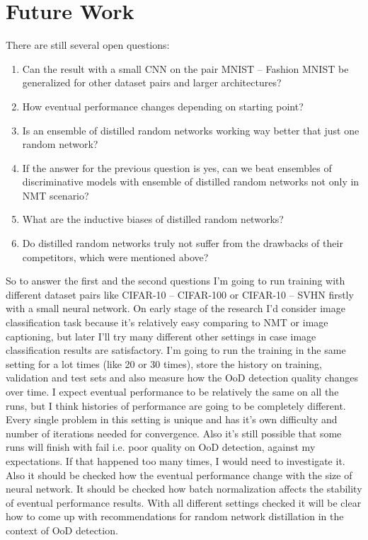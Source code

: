 \documentclass{article}
\begin{document}
\newpage
\section{Future Work}
    There are still several open questions:
    \begin{enumerate}
        \item Can the result with a small CNN on the pair MNIST -- Fashion MNIST be generalized for other dataset pairs and larger architectures?
        \item How eventual performance changes depending on starting point?
        \item Is an ensemble of distilled random networks working way better that just one random network?
        \item If the answer for the previous question is yes, can we beat ensembles of discriminative models with ensemble of distilled random networks not only in NMT scenario?
        \item What are the inductive biases of distilled random networks?
        \item Do distilled random networks truly not suffer from the drawbacks of their competitors, which were mentioned above?
    \end{enumerate}

    So to answer the first and the second questions I'm going to run training with different dataset pairs like CIFAR-10 -- CIFAR-100 or CIFAR-10 -- SVHN firstly with a small neural network. On early stage of the research I'd consider image classification task because it's relatively easy comparing to NMT or image captioning, but later I'll try many different other settings in case image classification results are satisfactory. I'm going to run the training in the same setting for a lot times (like 20 or 30 times), store the history on training, validation and test sets and also measure how the OoD detection quality changes over time. I expect eventual performance to be relatively the same on all the runs, but I think histories of performance are going to be completely different. Every single problem in this setting is unique and has it's own difficulty and number of iterations needed for convergence. Also it's still possible that some runs will finish with fail i.e. poor quality on OoD detection, against my expectations. If that happened too many times, I would need to investigate it. Also it should be checked how the eventual performance change with the size of neural network. It should be checked how batch normalization affects the stability of eventual performance results. With all different settings checked it will be clear how to come up with recommendations for random network distillation in the context of OoD detection.
\end{document}

